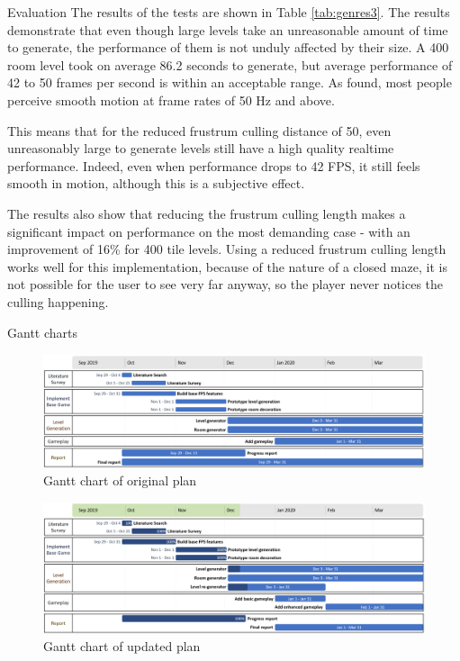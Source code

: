 \documentclass[final]{cmpreport}
\begin{document}
\begin{section}{Evaluation}
The results of the tests are shown in Table \ref{tab:genres3}. The results demonstrate that even though large levels take an unreasonable amount of time to generate, the performance of them is not unduly affected by their size. A 400 room level took on average 86.2 seconds to generate, but average performance of 42 to 50 frames per second is within an acceptable range. As \cite{Davis2015} found, most people perceive smooth motion at frame rates of 50 Hz and above.

This means that for the reduced frustrum culling distance of 50, even unreasonably large to generate levels still have a high quality realtime performance. Indeed, even when performance drops to 42 FPS, it still feels smooth in motion, although this is a subjective effect.

The results also show that reducing the frustrum culling length makes a significant impact on performance on the most demanding case - with an improvement of 16\% for 400 tile levels. Using a reduced frustrum culling length works well for this implementation, because of the nature of a closed maze, it is not possible for the user to see very far anyway, so the player never notices the culling happening. 

\end{section}





\newpage

\appendix

\begin{section}{Gantt charts}

\begin{figure}[H]
    \centering
    \includegraphics[angle=90,width=\textwidth,height=0.85\textheight,keepaspectratio]{img/gantt-original2.png}
    \caption{Gantt chart of original plan}
    \label{fig:gantt1}
\end{figure}

\begin{figure}[H]
    \centering
    \includegraphics[angle=90,width=\textwidth,height=0.85\textheight,keepaspectratio]{img/gantt-updated2.png}
    \caption{Gantt chart of updated plan}
    \label{fig:gantt2}
\end{figure}

\end{section}
\end{document}
